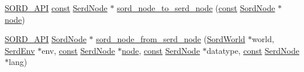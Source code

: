 \begin{DoxyCompactItemize}
\item 
\hyperlink{sord_8h_a1a2e27663366eb6ff41e062a0a880f48}{S\+O\+R\+D\+\_\+\+A\+PI} \hyperlink{getopt1_8c_a2c212835823e3c54a8ab6d95c652660e}{const} \hyperlink{struct_serd_node}{Serd\+Node} $\ast$ \hyperlink{group__sord_ga497e0859abcc9e6e39c5bcbfcc7c9f70}{sord\+\_\+node\+\_\+to\+\_\+serd\+\_\+node} (\hyperlink{getopt1_8c_a2c212835823e3c54a8ab6d95c652660e}{const} \hyperlink{group__sord_ga804ac7d56d9fdea50f2d1e7278b1f82b}{Sord\+Node} $\ast$\hyperlink{structnode}{node})
\item 
\hyperlink{sord_8h_a1a2e27663366eb6ff41e062a0a880f48}{S\+O\+R\+D\+\_\+\+A\+PI} \hyperlink{group__sord_ga804ac7d56d9fdea50f2d1e7278b1f82b}{Sord\+Node} $\ast$ \hyperlink{group__sord_ga9367640305491801ab3bed714aeb5448}{sord\+\_\+node\+\_\+from\+\_\+serd\+\_\+node} (\hyperlink{group__sord_ga133d918ec58f829198b2cf65f250ed69}{Sord\+World} $\ast$world, \hyperlink{group__serd_gaea4226dd80abea7afa05986f195d4755}{Serd\+Env} $\ast$env, \hyperlink{getopt1_8c_a2c212835823e3c54a8ab6d95c652660e}{const} \hyperlink{struct_serd_node}{Serd\+Node} $\ast$\hyperlink{structnode}{node}, \hyperlink{getopt1_8c_a2c212835823e3c54a8ab6d95c652660e}{const} \hyperlink{struct_serd_node}{Serd\+Node} $\ast$datatype, \hyperlink{getopt1_8c_a2c212835823e3c54a8ab6d95c652660e}{const} \hyperlink{struct_serd_node}{Serd\+Node} $\ast$lang)
\end{DoxyCompactItemize}
